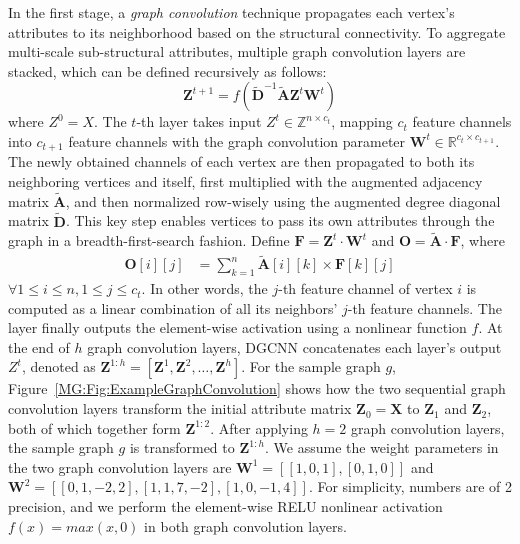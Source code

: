  In the first stage, a \textit{graph convolution} technique propagates each vertex's attributes to its neighborhood based on the structural connectivity.
To aggregate multi-scale sub-structural attributes, multiple graph
convolution layers are stacked, which can be defined recursively as follows:
\begin{equation}
    \mathbf{Z}^{t + 1} = f(\tilde{\mathbf{D}}^{-1} \tilde{\mathbf{A}} \mathbf{Z}^t \mathbf{W}^t)
\end{equation}
where $Z^0 = X$. The $t$-th layer takes input $Z^t \in \mathbb{Z}^{n \times c_t}$,
mapping $c_t$ feature channels into $c_{t+1}$ feature channels with the graph convolution parameter $\mathbf{W}^t \in \mathbb{R}^{c_t \times c_{t+1}}$.
The newly obtained channels of each vertex are then propagated to both its neighboring vertices and itself,
 first multiplied with the augmented adjacency matrix $\tilde{\mathbf{A}}$,
and then normalized row-wisely using the augmented degree diagonal matrix $\tilde{\mathbf{D}}$.
This key step enables vertices to pass its own attributes through the graph in a breadth-first-search fashion. %
Define $\mathbf{F} = \mathbf{Z}^t \cdot \mathbf{W}^t$ and $\mathbf{O} = \tilde{\mathbf{A}} \cdot \mathbf{F}$, where
\begin{align}
    \mathbf{O}[i][j] &= \sum_{k = 1}^{n} \tilde{\mathbf{A}}[i][k] \times \mathbf{F}[k][j]
\end{align}
$\forall 1\leq i \leq n, 1 \leq j \leq c_t$.
In other words, the $j$-th feature channel of vertex $i$ is computed as a linear combination of all its neighbors' $j$-th feature channels.
The layer finally outputs the element-wise activation using a nonlinear function $f$.
At the end of $h$ graph convolution layers, DGCNN concatenates each layer's output $Z^{t}$,
denoted as $\mathbf{Z}^{1:h} = [\mathbf{Z}^1, \mathbf{Z}^2, \ldots, \mathbf{Z}^{h}]$.
For the sample graph $g$, Figure~\ref{MG:Fig:ExampleGraphConvolution} shows how the two sequential graph convolution layers transform the initial attribute matrix $\mathbf{Z}_0=\mathbf{X}$ to $\mathbf{Z}_1$ and $\mathbf{Z}_2$, both of which together form $\mathbf{Z}^{1:2}$.
After applying $h=2$ graph convolution layers, the sample graph $g$ is transformed to $\mathbf{Z}^{1:h}$.
We assume the weight parameters in the two graph convolution layers are $\mathbf{W}^1 = [[1, 0 ,1], [0, 1, 0]]$ and $\mathbf{W}^2 = [[0, 1 ,-2, 2], [1, 1, 7, -2], [1, 0, -1, 4]]$.
For simplicity, numbers are of 2 precision, and we perform the element-wise RELU nonlinear activation $f(x) = max(x, 0)$ in both graph convolution layers.


